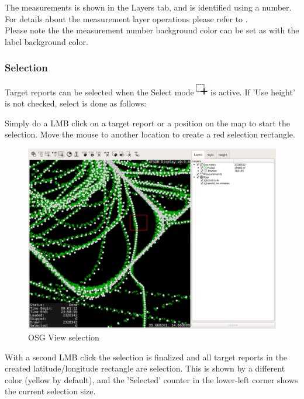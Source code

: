 The measurements is shown in the Layers tab, and is identified using a number. For details about the measurement layer operations please refer to . \\

Please note the the measurement number background color can be set as with the label background color. 

\subsubsection{Selection}
\label{sec:osgview_selection}

Target reports can be selected when the Select mode \includegraphics[width=0.5cm,frame]{../../data/icons/select_action.png} is active. If 'Use height' is not checked, select is done as follows:

Simply do a LMB click on a target report or a position on the map to start the selection. Move the mouse to another location to create a red selection rectangle.

\begin{figure}[H]
    \hspace*{-2.5cm}
    \includegraphics[width=19cm,frame]{../screenshots/osgview_select1.png}
  \caption{OSG View selection}
\end{figure}

With a second LMB click the selection is finalized and all target reports in the created latitude/longitude rectangle are selection. This is shown by a different color (yellow by default), and the 'Selected' counter in the lower-left corner shows the current selection size.

